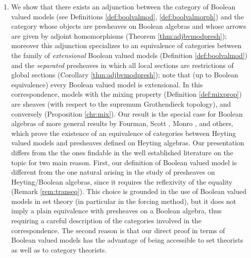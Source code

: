 \documentclass[11pt]{amsart}
\theoremstyle{plain}
\theoremstyle{definition}
\theoremstyle{plain}
\theoremstyle{remark}
\newcommand{\0}{\mathsf{0}}
\renewcommand{\1}{\mathsf{1}}
\renewcommand{\2}{\mathsf{2}}
\theoremstyle{definition}
\begin{document}
\begin{enumerate}
\item \label{equiv:boo}
We show that there exists an adjunction 
between the category of Boolean valued models (see Definitions \ref{def:boolvalmod}, \ref{def:boolvalmorph})
and the category whose objects are
presheaves on Boolean algebras and whose arrows are given by adjoint homomorphisms (Theorem \ref{thm:adjbvmodpresh}); moreover this adjunction specializes
to an equivalence of categories between the family of \emph{extensional} Boolean valued models (Definition
\ref{def:boolvalmod}) and the \emph{separated} presheaves 
in which all local sections are restrictions of global sections (Corollary \ref{thm:adjbvmodpresh}); note that (up to Boolean 
equivalence) every
 Boolean valued model is extensional.  In this correspondence, models with the mixing 
property (Definition \ref{def:mixprop})
are sheaves (with respect to the supremum Grothendieck topology), and conversely (Proposition \ref{chr:mix}). 
Our result is the special case for Boolean algebras of more general results by Fourman, Scott \cite{FOURSCOTT}, Monro \cite{MONRO86, MONROBIS}, and others, which prove the existence of an equivalence of categories between Heyting valued models and presheaves defined on Heyting algebras. Our presentation differs from the the ones findable in the well established literature on the topic for two main reason. First, our definition of Boolean valued model is different from the one natural arising in the study of presheaves on Heyting/Boolean algebras, since it requires the reflexivity of the equality (Remark \ref{rem:transeq}). This choice is grounded in the use of Boolean valued models in set theory (in particular in the forcing method), but it does not imply a plain equivalence with presheaves on a Boolean algebra, thus requiring a careful description of the categories involved in the correspondence. The second reason is that our direct proof in terms of Boolean valued models has the advantage of being accessible to
set theorists as well as to category theorists. 


\end{enumerate}
\end{document}
